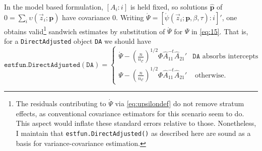 \documentclass{article}
\newcommand{\absorbInterceptsEF}{\upsilon}
\begin{document}
In the model based formulation, $[A_{i}: i]$ is held fixed, so
solutions $\hat{\mathbf{p}}$ of
$0 = \sum_{i}\absorbInterceptsEF(\vec{z}_{i}; \mathbf{p})$ have
covariance 0.  Writing $\acute{\Psi} =
[\acute{\psi}(\vec{z}_{i}; \mathbf{p}, \beta, \tau) : i]'$, one
obtains valid\footnote{%
The residuals contributing to $\acute{\Psi}$ via \eqref{eq:upsilondef} do not remove stratum
effects, as conventional covariance estimators for this scenario
seem to do.  This aspect would inflate these standard errors
relative to those. Nonetheless, I maintain that
\texttt{estfun.DirectAdjusted()} as described here are sound as a
basis for variance-covariance estimation.}
  sandwich estimates by substitution of $\acute{\Psi}$ for
$\Psi$ in \eqref{eq:15}.  That is, for a
\texttt{DirectAdjusted} object \texttt{DA} we should have
\begin{equation*}
\mathtt{estfun.DirectAdjusted(DA)} = 
  \begin{cases}
  \acute{\Psi} -
  \left(\frac{n}{n_{\mathcal{C}}}\right)^{1/2}\Phi
  \hat{A}_{11}^{-t}\hat{A}_{21}'& \mathtt{DA} \text{ absorbs
    intercepts}\\
\Psi -
  \left(\frac{n}{n_{\mathcal{C}}}\right)^{1/2}\Phi
  \hat{A}_{11}^{-t}\hat{A}_{21}'  & \text{ otherwise}.
\end{cases}
\end{equation*}
\end{document}
